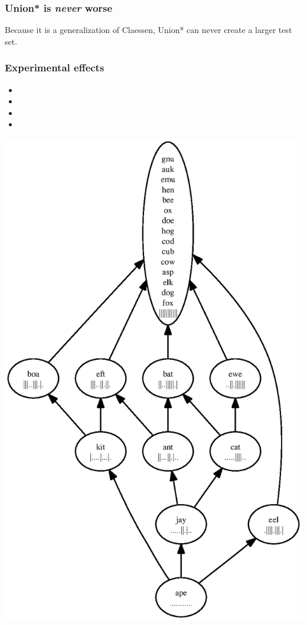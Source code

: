 \documentclass[svgnames,14pt]{beamer}
\theoremstyle{definition}
\begin{document}
\begin{frame}
\frametitle{Union* is \emph{never} worse}
Because it is a generalization of Claessen, Union* can never create a larger test set.
\end{frame}

\begin{frame}
\frametitle{Experimental effects}
\begin{itemize}
\item {}
\item {}
\item {}
\item {}
\end{itemize}
\end{frame}

\begin{frame}
\centerline{\includegraphics[height=\textheight]{success.ps}}
\end{frame}
\end{document}
